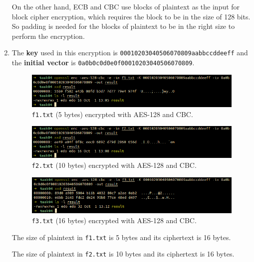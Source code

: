 \documentclass{article}
\begin{document}
\begin{enumerate}
        On the other hand, ECB and CBC use blocks of plaintext as the input for
        block cipher encryption, which requires the block to be in the size of
        128 bits. So padding is needed for the blocks of plaintext to be in
        the right size to perform the encryption.

    \item The \textbf{key} used in this encryption is \texttt{00010203040506070809aabbccddeeff}
        and the \textbf{initial vector} is \texttt{0a0b0c0d0e0f00010203040506070809}.

        \begin{figure}[!ht]
            \centering
            \includegraphics[scale=0.68]{task04_2_e1.png}
            \caption{\texttt{f1.txt} (5 bytes) encrypted with AES-128 and CBC.}
        \end{figure}

        \begin{figure}[!ht]
            \centering
            \includegraphics[scale=0.68]{task04_2_e2.png}
            \caption{\texttt{f2.txt} (10 bytes) encrypted with AES-128 and CBC.}
        \end{figure}

        \begin{figure}[!ht]
            \centering
            \includegraphics[scale=0.68]{task04_2_e3.png}
            \caption{\texttt{f3.txt} (16 bytes) encrypted with AES-128 and CBC.}
        \end{figure}

        The size of plaintext in \texttt{f1.txt} is 5 bytes and its ciphertext
        is 16 bytes.

        The size of plaintext in \texttt{f2.txt} is 10 bytes and its ciphertext
        is 16 bytes.


\end{enumerate}
\end{document}
